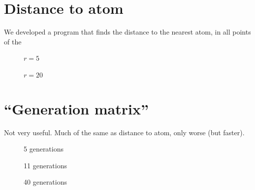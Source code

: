 \FloatBarrier
\section{Distance to atom}
We developed a program that finds the distance to the nearest atom, in all points of the 
%
\setlength{\myfigwidth}{0.90\textwidth}%
\begin{figure}[htpb]%
    \centering%
    \caption{$r = 5$ \Ang}%
    \label{fig:distance_to_atom_r05}%
\end{figure}%
%
\begin{figure}[htpb]%
    \centering%
    \caption{$r = 20$ \Ang}%
    \label{fig:distance_to_atom_r20}%
\end{figure}%

\FloatBarrier
\section{``Generation matrix''}
Not very useful. Much of the same as distance to atom, only worse (but faster).
%
\begin{figure}[htpb]%
    \centering%
    \caption{5 generations}%
    \label{fig:generation_matrix_r05}%
\end{figure}%
%
\begin{figure}[htpb]%
    \centering%
    \caption{11 generations}%
    \label{fig:generation_matrix_r11}%
\end{figure}%
%
\begin{figure}[htpb]%
    \centering%
    \caption{40 generations}%
    \label{fig:generation_matrix_r40}%
\end{figure}%

\FloatBarrier

